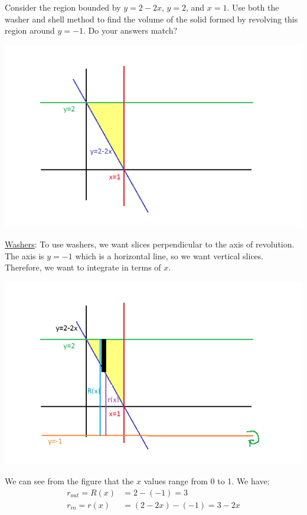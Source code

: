 \documentclass[handout]{ximera}
\begin{document}
\begin{problem}
Consider the region bounded by $y=2-2x$, $y=2$, and $x=1$.  Use both the washer and shell method to find the volume of the solid formed by revolving this region around $y=-1$.  Do your answers match?


	\begin{freeResponse}
\begin{image}
\includegraphics{Figure6-4-10.png}
\end{image}

	
\underline{Washers}:  To use washers, we want slices perpendicular to the axis of revolution.  The axis is $y=-1$ which is a horizontal line, so we want vertical slices.  Therefore, we want to integrate in terms of $x$.  

\begin{image}
\includegraphics{Figure6-4-11.png}
\end{image}

We can see from the figure that the $x$ values range from 0 to 1.  We have:
\begin{align*}
r_{out} = R(x) &= 2-(-1) = 3\\
r_{in} = r(x) &= (2 -2x) - (-1) = 3 - 2x
\end{align*}


\end{freeResponse}
\end{problem}
\end{document}
